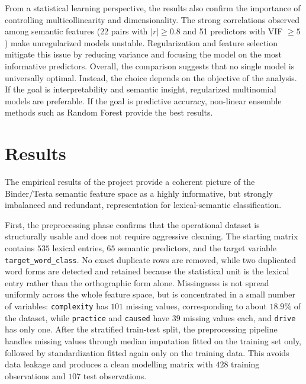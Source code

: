 \documentclass{ipgpmaster}
\begin{document}
From a statistical learning perspective, the results also confirm the importance of controlling multicollinearity and dimensionality. The strong correlations observed among semantic features (22 pairs with $|r|\geq 0.8$ and 51 predictors with VIF $\geq 5$) make unregularized models unstable. Regularization and feature selection mitigate this issue by reducing variance and focusing the model on the most informative predictors.
Overall, the comparison suggests that no single model is universally optimal. Instead, the choice depends on the objective of the analysis. If the goal is interpretability and semantic insight, regularized multinomial models are preferable. If the goal is predictive accuracy, non-linear ensemble methods such as Random Forest provide the best results.

\vspace{0.5cm}

\section{Results}
\label{sec:results}
The empirical results of the project provide a coherent picture of the Binder/Testa semantic feature space as a highly informative, but strongly imbalanced and redundant, representation for lexical-semantic classification.

First, the preprocessing phase confirms that the operational dataset is structurally usable and does not require aggressive cleaning. The starting matrix contains \(535\) lexical entries, \(65\) semantic predictors, and the target variable \texttt{target\_word\_class}. No exact duplicate rows are removed, while two duplicated word forms are detected and retained because the statistical unit is the lexical entry rather than the orthographic form alone. Missingness is not spread uniformly across the whole feature space, but is concentrated in a small number of variables: \texttt{complexity} has \(101\) missing values, corresponding to about \(18.9\%\) of the dataset, while \texttt{practice} and \texttt{caused} have \(39\) missing values each, and \texttt{drive} has only one. After the stratified train-test split, the preprocessing pipeline handles missing values through median imputation fitted on the training set only, followed by standardization fitted again only on the training data. This avoids data leakage and produces a clean modelling matrix with \(428\) training observations and \(107\) test observations.
\end{document}
